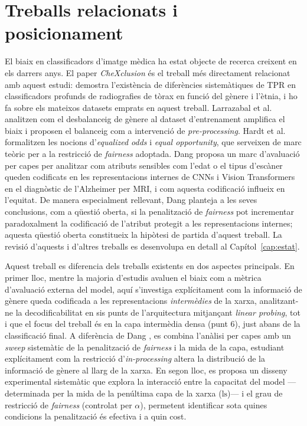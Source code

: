 \documentclass[a4paper,12pt,twoside]{ThesisStyle}
\begin{document}
\section{Treballs relacionats i posicionament}

El biaix en classificadors d'imatge mèdica ha estat objecte de recerca creixent en els darrers anys. El paper \textit{CheXclusion} \cite{SeyyedKalantari2021} és el treball més directament relacionat amb aquest estudi: demostra l'existència de diferències sistemàtiques de TPR en classificadors profunds de radiografies de tòrax en funció del gènere i l'ètnia, i ho fa sobre els mateixos datasets emprats en aquest treball. Larrazabal et al.\ \cite{Larrazabal2020} analitzen com el desbalanceig de gènere al dataset d'entrenament amplifica el biaix i proposen el balanceig com a intervenció de \textit{pre-processing}. Hardt et al.\ \cite{Hardt2016} formalitzen les nocions d'\textit{equalized odds} i \textit{equal opportunity}, que serveixen de marc teòric per a la restricció de \textit{fairness} adoptada. Dang \cite{dang2026} proposa un marc d'avaluació per capes per analitzar com atributs sensibles com l'edat o el tipus d'escàner queden codificats en les representacions internes de CNNs i Vision Transformers en el diagnòstic de l'Alzheimer per MRI, i com aquesta codificació influeix en l'equitat. De manera especialment rellevant, Dang planteja a les seves conclusions, com a qüestió oberta, si la penalització de \textit{fairness} pot incrementar paradoxalment la codificació de l'atribut protegit a les representacions internes; aquesta qüestió oberta constitueix la hipòtesi de partida d'aquest treball. La revisió d'aquests i d'altres treballs es desenvolupa en detall al Capítol~\ref{cap:estat}.

Aquest treball es diferencia dels treballs existents en dos aspectes principals. En primer lloc, mentre la majoria d'estudis avaluen el biaix com a mètrica d'avaluació externa del model, aquí s'investiga explícitament com la informació de gènere queda codificada a les representacions \textit{intermèdies} de la xarxa, analitzant-ne la decodificabilitat en sis punts de l'arquitectura mitjançant \textit{linear probing}, tot i que el focus del treball és en la capa intermèdia densa (punt 6), just abans de la classificació final. A diferència de Dang \cite{dang2026}, es combina l'anàlisi per capes amb un \textit{sweep} sistemàtic de la penalització de \textit{fairness} i la mida de la capa, estudiant explícitament com la restricció d'\textit{in-processing} altera la distribució de la informació de gènere al llarg de la xarxa. En segon lloc, es proposa un disseny experimental sistemàtic que explora la interacció entre la capacitat del model ---determinada per la mida de la penúltima capa de la xarxa ($\text{ls}$)--- i el grau de restricció de \textit{fairness} (controlat per $\alpha$), permetent identificar sota quines condicions la penalització és efectiva i a quin cost.
\end{document}

